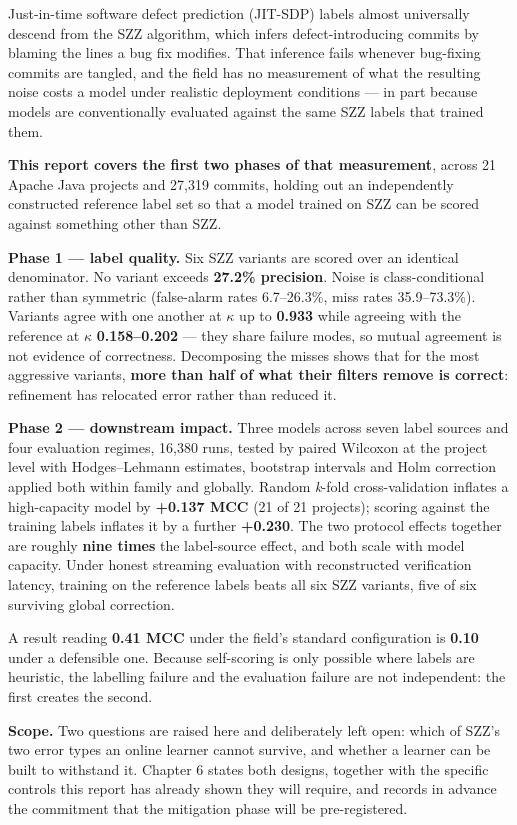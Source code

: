 Just-in-time software defect prediction (JIT-SDP) labels almost
universally descend from the SZZ algorithm, which infers
defect-introducing commits by blaming the lines a bug fix modifies. That
inference fails whenever bug-fixing commits are tangled, and the field
has no measurement of what the resulting noise costs a model under
realistic deployment conditions --- in part because models are
conventionally evaluated against the same SZZ labels that trained them.

\textbf{This report covers the first two phases of that measurement},
across 21 Apache Java projects and 27,319 commits, holding out an
independently constructed reference label set so that a model trained on
SZZ can be scored against something other than SZZ.

\textbf{Phase 1 --- label quality.} Six SZZ variants are scored over an
identical denominator. No variant exceeds \textbf{27.2\% precision}.
Noise is class-conditional rather than symmetric (false-alarm rates
6.7--26.3\%, miss rates 35.9--73.3\%). Variants agree with one another
at \ensuremath{\kappa} up to \textbf{0.933} while agreeing with the reference at \ensuremath{\kappa}
\textbf{0.158--0.202} --- they share failure modes, so mutual agreement
is not evidence of correctness. Decomposing the misses shows that for
the most aggressive variants, \textbf{more than half of what their
filters remove is correct}: refinement has relocated error rather than
reduced it.

\textbf{Phase 2 --- downstream impact.} Three models across seven label
sources and four evaluation regimes, 16,380 runs, tested by paired
Wilcoxon at the project level with Hodges--Lehmann estimates, bootstrap
intervals and Holm correction applied both within family and globally.
Random \emph{k}-fold cross-validation inflates a high-capacity model by
\textbf{+0.137 MCC} (21 of 21 projects); scoring against the training
labels inflates it by a further \textbf{+0.230}. The two protocol
effects together are roughly \textbf{nine times} the label-source
effect, and both scale with model capacity. Under honest streaming
evaluation with reconstructed verification latency, training on the
reference labels beats all six SZZ variants, five of six surviving
global correction.

A result reading \textbf{0.41 MCC} under the field's standard
configuration is \textbf{0.10} under a defensible one. Because
self-scoring is only possible where labels are heuristic, the labelling
failure and the evaluation failure are not independent: the first
creates the second.

\textbf{Scope.} Two questions are raised here and deliberately left
open: which of SZZ's two error types an online learner cannot survive,
and whether a learner can be built to withstand it. Chapter 6 states
both designs, together with the specific controls this report has
already shown they will require, and records in advance the commitment
that the mitigation phase will be pre-registered.
